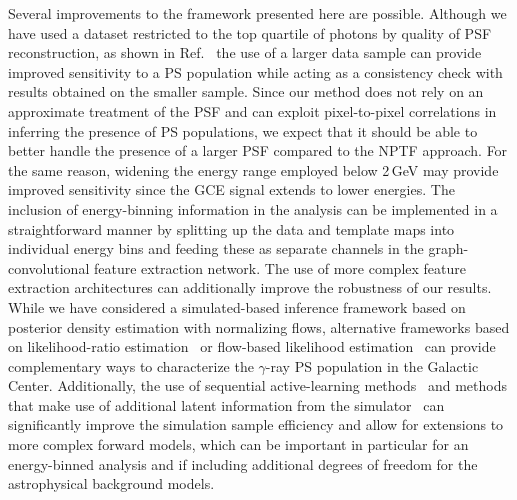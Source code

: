 \documentclass[prd,aps,10pt,nofootinbib,twocolumn,superscriptaddress,preprintnumbers,balancelastpage,longbibliography,floatfix]{revtex4-2}
\newcommand{\changes}[1]{{{\color{red}#1}}}
\begin{document}
Several improvements to the framework presented here are possible. Although we have used a dataset restricted to the top quartile of photons by quality of PSF reconstruction, as shown in Ref.~\cite{Leane:2020pfc} the use of a larger data sample can provide improved sensitivity to a PS population while acting as a consistency \changes{check} with results obtained on the smaller sample. \changes{Since our method does not rely on an approximate treatment of the PSF and can exploit pixel-to-pixel correlations in inferring the presence of PS populations, we expect that it should be able to better handle the presence of a larger PSF compared to the NPTF approach. For the same reason, widening the energy range employed below 2\,GeV may provide improved sensitivity since the GCE signal extends to lower energies.} The inclusion of energy-binning information in the analysis can be implemented in a straightforward manner by splitting up the data and template maps into individual energy bins and feeding these as separate channels in the graph-convolutional feature extraction network. The use of more complex feature extraction architectures can additionally improve the robustness of our results. 
While we have considered a simulated-based inference framework based on posterior density estimation with normalizing flows, alternative frameworks based on likelihood-ratio estimation~\cite{Brehmer:2018eca,Brehmer:2018hga,Brehmer:2018kdj,Cranmer:2015bka, Hermans:2019ioj,Miller:2020hua,Miller:2021hys} or flow-based likelihood estimation~\cite{2019arXiv191200042W,pmlr-v89-papamakarios19a} can provide complementary ways to characterize the $\gamma$-ray PS population in the Galactic Center. Additionally, the use of sequential active-learning methods~\cite{pmlr-v89-papamakarios19a} and methods that make use of additional latent information from the simulator~\cite{Brehmer:2018eca,Brehmer:2018hga,Brehmer:2018kdj,Brehmer:2019xox,Stoye:2018ovl} can significantly improve the simulation sample efficiency and allow for extensions to more complex forward models, which can be important in particular for an energy-binned analysis and if including additional degrees of freedom for the astrophysical background models. 
\end{document}
